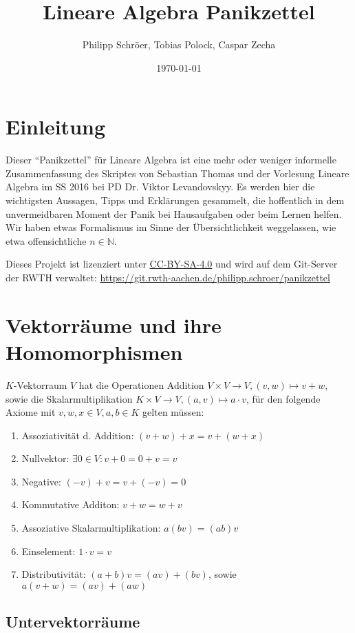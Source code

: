 \documentclass[11pt]{scrartcl}
\title{\textbf{Lineare Algebra Panikzettel}}
\author{Philipp Schröer, Tobias Polock, Caspar Zecha}
\date{\today}
\begin{document}
\maketitle

\section{Einleitung}

Dieser ``Panikzettel'' für Lineare Algebra ist eine mehr oder weniger informelle Zusammenfassung des Skriptes von Sebastian Thomas und der Vorlesung Lineare Algebra im SS 2016 bei PD Dr. Viktor Levandovskyy. Es werden hier die wichtigsten Aussagen, Tipps und Erklärungen gesammelt, die hoffentlich in dem unvermeidbaren Moment der Panik bei Hausaufgaben oder beim Lernen helfen. Wir haben etwas Formalismus im Sinne der Übersichtlichkeit weggelassen, wie etwa offensichtliche $n \in \mathbb{N}$.

Dieses Projekt ist lizenziert unter \href{https://creativecommons.org/licenses/by-sa/4.0/}{CC-BY-SA-4.0} und wird auf dem Git-Server der RWTH verwaltet: \url{https://git.rwth-aachen.de/philipp.schroer/panikzettel}

\section{Vektorräume und ihre Homomorphismen}

$K$-Vektorraum $V$ hat die Operationen Addition  $V \times V \to V, (v,w) \mapsto v+w$, sowie die Skalarmultiplikation $K \times V \to V, (a,v) \mapsto a \cdot v  $, für den folgende Axiome mit $v, w, x \in V, a,b \in K$ gelten müssen:

\begin{enumerate}
\item Assoziativität d. Addition: $(v+w)+x = v+(w+x)$
\item Nullvektor: $\exists 0 \in V: v+0=0+v=v$
\item Negative: $(-v)+v=v+(-v)=0$
\item Kommutative Additon: $v+w=w+v$
\item Assoziative Skalarmultiplikation: $a(bv)=(ab)v$
\item Einselement: $1\cdot v=v$
\item Distributivität: $(a+b)v=(av)+(bv)$, sowie $a(v+w)=(av)+(aw)$
\end{enumerate}

\subsection{Untervektorräume}
\end{document}
